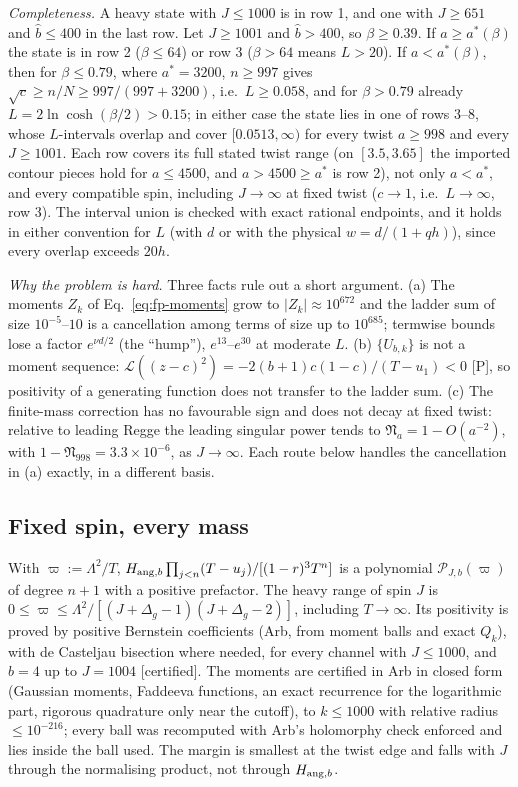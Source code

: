 \emph{Completeness.} A heavy state with $J\le1000$ is in row 1, and one with $J\ge651$ and $\hat b\le400$ in the last row. Let
$J\ge1001$ and $\hat b>400$, so $\beta\ge0.39$. If $a\ge a^*(\beta)$ the state is in row 2 ($\beta\le64$) or row 3 ($\beta>64$ means
$L>20$). If $a<a^*(\beta)$, then for $\beta\le0.79$, where $a^*=3200$, $n\ge997$ gives $\sqrt c\ge n/N\ge997/(997+3200)$, i.e.\ $L\ge0.058$,
and for $\beta>0.79$ already $L=2\ln\cosh(\beta/2)>0.15$; in either case the state lies in one of rows 3--8, whose $L$-intervals overlap and cover $[0.0513,\infty)$
for every twist $a\ge998$ and every $J\ge1001$. Each row covers its full stated twist range (on $[3.5,3.65]$ the imported contour pieces hold for $a\le4500$, and $a>4500\ge a^*$ is row 2), not only $a<a^*$, and every compatible
spin, including $J\to\infty$ at fixed twist ($c\to1$, i.e.\ $L\to\infty$, row 3). The interval union is checked with exact rational
endpoints, and it holds in either convention for $L$ (with $d$ or with the physical $w=d/(1+qh)$), since every overlap exceeds $20h$.

\emph{Why the problem is hard.} Three facts rule out a short argument. (a) The moments $Z_k$ of Eq.~\eqref{eq:fp-moments} grow to
$|Z_k|\approx10^{672}$ and the ladder sum of size $10^{-5}$--$10$ is a cancellation among terms of size up to $10^{685}$; termwise
bounds lose a factor $e^{\nu d/2}$ (the ``hump''), $e^{13}$--$e^{30}$ at moderate $L$. (b) $\{U_{b,k}\}$ is not a moment sequence:
$\mathcal L((z-c)^2)=-2(b+1)c(1-c)/(T-u_1)<0$ [P], so positivity of a generating function does not transfer to the ladder sum.
(c) The finite-mass correction has no favourable sign and does not decay at fixed twist: relative to leading Regge the leading
singular power tends to $\mathfrak N_a=1-O(a^{-2})$, with $1-\mathfrak N_{998}=3.3\times10^{-6}$, as $J\to\infty$. Each route below handles
the cancellation in (a) exactly, in a different basis.

\subsection{Fixed spin, every mass}
With $\varpi:=\Lambda^2/T$, $H_{{\rm ang},b}\prod_{j<n}(T-u_j)/[(1-r)^3T^n]$ is a polynomial $\mathcal P_{J,b}(\varpi)$ of degree $n+1$
with a positive prefactor. The heavy range of spin $J$ is $0\le\varpi\le\Lambda^2/[(J+\Delta_g-1)(J+\Delta_g-2)]$, including
$T\to\infty$. Its positivity is proved by positive Bernstein coefficients (Arb, from moment balls and exact $Q_k$), with de Casteljau
bisection where needed, for every channel with $J\le1000$, and $b=4$ up to $J=1004$ [certified]. The moments are certified in Arb in
closed form (Gaussian moments, Faddeeva functions, an exact recurrence for the logarithmic part, rigorous quadrature only near the
cutoff), to $k\le1000$ with relative radius $\le10^{-216}$; every ball was recomputed with Arb's holomorphy check enforced and lies
inside the ball used. The margin is smallest at the twist edge and falls with $J$ through the normalising product, not through
$H_{{\rm ang},b}$.

